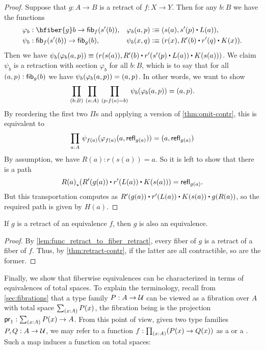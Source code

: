 \begin{proof}
Suppose that $g:A\to B$ is a retract of $f:X\to Y$. Then for any $b:B$ we have the functions
\begin{align*}
\varphi_b &:\hfiber{g}b\to\hfib{f}{s'(b)}, &
\varphi_b(a,p) & \defeq \pairr{s(a),s'(p)\ct L(a)},\\
\psi_b &:\hfib{f}{s'(b)}\to\hfib{g}b, &
\psi_b(x,q) &\defeq \pairr{r(x),R'(b)\ct r'(q)\ct K(x)}.
\end{align*}
Then we have $\psi_b(\varphi_b({a,p}))\equiv\pairr{r(s(a)),R'(b)\ct r'(s'(p)\ct L(a))\ct K(s(a))}$.
We claim $\psi_b$ is a retraction with section $\varphi_b$ for all $b:B$, which is to say that for all $(a,p):{\mathsf{fib}}_{g}(b)$ we have $\psi_b(\varphi_b({a,p}))= {\mathopen{}(a,p)\mathclose{}}$.
In other words, we want to show
\begin{equation*}
\prd{b:B}{a:A}{p:f(a)=b} \psi_b(\varphi_b({a,p}))= \pairr{a,p}.
\end{equation*}
By reordering the first two $\Pi$s and applying a version of \autoref{thm:omit-contr}, this is equivalent to
\begin{equation*}
\prd{a:A}\psi_{f(a)}(\varphi_{f(a)}({a,\refl{g(a)}}))=\pairr{a,\refl{g(a)}}
\end{equation*}
By assumption, we have $R(a):r(s(a))= a$. So it is left to show that there is a path
\begin{equation*}
\trans{R(a)}{R'(g(a))\ct r'(L(a))\ct K(s(a))} = \refl{g(a)}.
\end{equation*}
But this transportation computes as $R'(g(a))\ct r'(L(a))\ct K(s(a))\ct g(R(a))$, so the required path is given by $H(a)$.
\end{proof}

\begin{thm}\label{thm:retract-equiv}
  If $g$ is a retract of an equivalence $f$, then $g$ is also an equivalence.
\end{thm}
\begin{proof}
  By \autoref{lem:func_retract_to_fiber_retract}, every fiber of $g$ is a retract of a fiber of $f$.
  Thus, by \autoref{thm:retract-contr}, if the latter are all contractible, so are the former.
\end{proof}

%
%
Finally, we show that fiberwise equivalences can be characterized in terms of equivalences of total spaces.
To explain the terminology, recall from \autoref{sec:fibrations} that a type family $P:A\to\mathcal{U}$ can be viewed as a fibration over $A$ with total space $\sm{x:A} P(x)$, the fibration being is the projection $\proj1:\sm{x:A} P(x) \to A$.
From this point of view, given two type families $P,Q:A\to\mathcal{U}$, we may refer to a function $f:\prd{x:A} (P(x)\to Q(x))$ as a  or a .
%
%
%
%
Such a map induces a function on total spaces:

